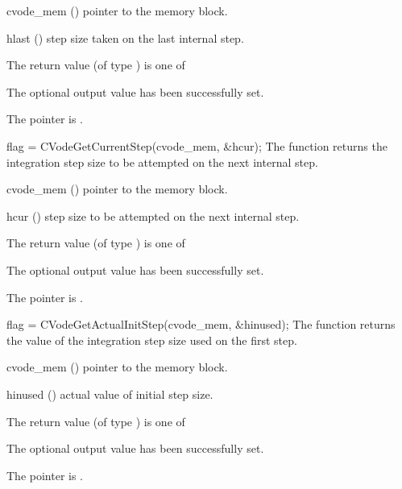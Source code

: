 {
  \begin{args}
  \item[cvode\_mem] ()
    pointer to the {\cvode} memory block.
  \item[hlast] ()
    step size taken on the last internal step.
  \end{args}
}
{
  The return value  (of type ) is one of
  \begin{args}
  \item[\Id{CV\_SUCCESS}] 
    The optional output value has been successfully set.
  \item[\Id{CV\_MEM\_NULL}]
    The  pointer is .
  \end{args}
}
{}
{
  flag = CVodeGetCurrentStep(cvode\_mem, \&hcur);
}
{
  The function  returns the
  integration step size to be attempted on the next internal step.
}
{
  \begin{args}
  \item[cvode\_mem] ()
    pointer to the {\cvode} memory block.
  \item[hcur] ()
    step size to be attempted on the next internal step.
  \end{args}
}
{
  The return value  (of type ) is one of
  \begin{args}
  \item[\Id{CV\_SUCCESS}] 
    The optional output value has been successfully set.
  \item[\Id{CV\_MEM\_NULL}]
    The  pointer is .
  \end{args}
}
{}
{
  flag = CVodeGetActualInitStep(cvode\_mem, \&hinused);
}
{
  The function  returns the
  value of the integration step size used on the first step.
}
{
  \begin{args}
  \item[cvode\_mem] ()
    pointer to the {\cvode} memory block.
  \item[hinused] ()
    actual value of initial step size.
  \end{args}
}
{
  The return value  (of type ) is one of
  \begin{args}
  \item[\Id{CV\_SUCCESS}] 
    The optional output value has been successfully set.
  \item[\Id{CV\_MEM\_NULL}]
    The  pointer is .
  \end{args}
}
